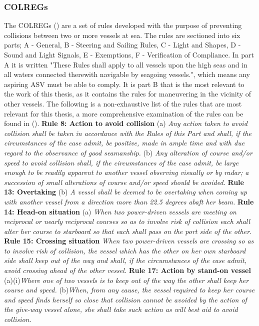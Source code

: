 \subsubsection*{COLREGs}
The \gls{COLREGs} (\cite{WikisourceCOLREGS}) are a set of rules developed with the purpose of preventing collisions between two or more vessels at sea.
The rules are sectioned into six parts; A - General, B - Steering and Sailing Rules, C - Light and Shapes, D - Sound and Light Signals, E - Exemptions,
F - Verification of Compliance. In part A it is written "These Rules shall apply to all vessels upon the high seas and in all waters connected therewith 
navigable by seagoing vessels.", which means any aspiring \gls{ASV} must be able to comply. It is part B that is the most relevant to the work of this thesis,
as it contains the rules for maneuvering in the vicinity of other vessels. The following is a non-exhaustive list of the rules that are most
relevant for this thesis, a more comprehensive examination of the rules can be found in (\cite{cockcroft2012manoeuvres}).\newline
\textbf{Rule 8: Action to avoid collision}\newline
(a) \textit{Any action taken to avoid collision shall be taken in accordance with the Rules of this Part and shall, 
if the circumstances of the case admit, be positive, made in ample time and with due regard to the observance of good seamanship.}\newline
(b) \textit{Any alteration of course and/or speed to avoid collision shall, if the circumstances of the case admit, be large enough to be readily 
apparent to another vessel observing visually or by radar; a succession of small alterations of course and/or speed should be avoided.}\newline
\textbf{Rule 13: Overtaking}\newline
(b) \textit{A vessel shall be deemed to be overtaking when coming up with another vessel from a direction more than 22.5 degrees abaft her beam.}\newline
\textbf{Rule 14: Head-on situation}\newline
(a) \textit{When two power-driven vessels are meeting on reciprocal or nearly reciprocal courses so as to involve risk of collision each shall alter her 
course to starboard so that each shall pass on the port side of the other.}\newline
\textbf{Rule 15: Crossing situation}\newline
\textit{When two power-driven vessels are crossing so as to involve risk of collision, the vessel which has the other on her own starboard 
side shall keep out of the way and shall, if the circumstances of the case admit, avoid crossing ahead of the other vessel.}\newline
\textbf{Rule 17: Action by stand-on vessel}\newline
(a)(i)\textit{Where one of two vessels is to keep out of the way the other shall keep her course and speed.}\newline
(b)\textit{When, from any cause, the vessel required to keep her course and speed finds herself so close that collision 
cannot be avoided by the action of the give-way vessel alone, she shall take such action as will best aid to avoid collision.}

